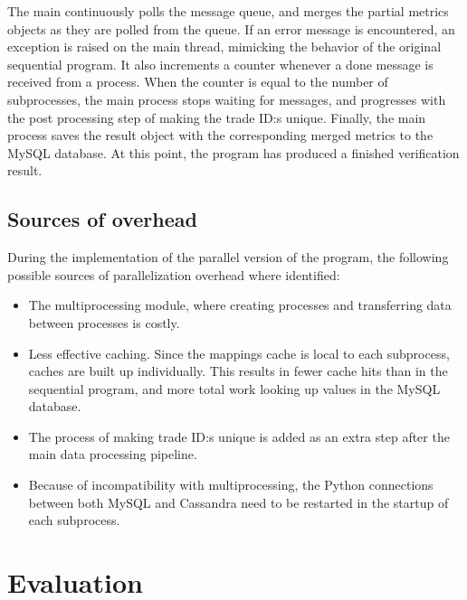 The main continuously polls the message queue, and merges the partial metrics objects as they are polled from the queue. If an error message is encountered, an exception is raised on the main thread, mimicking the
behavior of the original sequential program. It also increments a counter whenever a done message is received from a process. When the counter is equal to the number of subprocesses, the main process stops waiting
for messages, and progresses with the post processing step of making the trade ID:s unique. Finally, the main process saves the result object with the corresponding merged metrics to the MySQL database. At this point,
the program has produced a finished verification result.

\subsection{Sources of overhead}
During the implementation of the parallel version of the program, the following possible sources of parallelization overhead where identified:

\begin{itemize}
  \item The multiprocessing module, where creating processes and transferring data between processes is costly.
  \item Less effective caching. Since the mappings cache is local to each subprocess, caches are built up individually. This results in fewer cache hits than in the sequential program, and more total work
    looking up values in the MySQL database.
  \item The process of making trade ID:s unique is added as an extra step after the main data processing pipeline.
  \item Because of incompatibility with multiprocessing, the Python connections between both MySQL and Cassandra need to be restarted in the startup of each subprocess.
\end{itemize}

\section{Evaluation}

